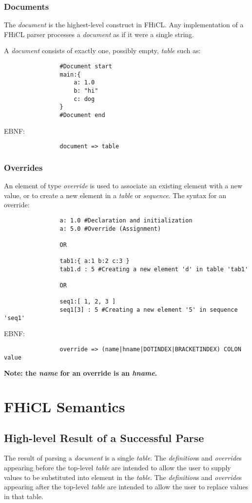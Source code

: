 \documentclass{article}
\begin{document}
		\subsubsection{Documents}
			The \emph{document} is the highest-level construct 
			in FHiCL.
			Any implementation of a FHiCL parser
			processes a \emph{document}
			as if it were a single string.

			A \emph{document} consists of exactly one,
			possibly empty,
			\emph{table} such as:
			\begin{verbatim}
				#Document start
				main:{
					a: 1.0
					b: "hi"
					c: dog
				}
				#Document end
			\end{verbatim}	
			\vspace{1mm}
			EBNF:
			\begin{verbatim}
				document => table
			\end{verbatim}
			
		\subsubsection{Overrides}
			An element of type \emph{override} is used to associate 
			an existing element with a new value,
			or to create a new element in a \emph{table} or \emph{sequence}.
			The syntax for an override:
			\begin{verbatim}
				a: 1.0 #Declaration and initialization
				a: 5.0 #Override (Assignment)
				
				OR
				
				tab1:{ a:1 b:2 c:3 }
				tab1.d : 5 #Creating a new element 'd' in table 'tab1'
				
				OR
				
				seq1:[ 1, 2, 3 ]
				seq1[3] : 5 #Creating a new element '5' in sequence 'seq1'
			\end{verbatim}
			\vspace{1mm}
			EBNF:
			\begin{verbatim}
				override => (name|hname|DOTINDEX|BRACKETINDEX) COLON value
			\end{verbatim}	
			\bf Note: \rm the \emph{name} for an override 
			is an \emph{hname}.
			
\section{FHiCL Semantics}
	\subsection{High-level Result of a Successful Parse}
		The result of parsing a \emph{document}
		is a single \emph{table}.
		The \emph{definition}s and \emph{override}s
		appearing before the top-level \emph{table}
		are intended to allow the user
		to supply values to be substituted into element in the \emph{table}.
		The \emph{definition}s and \emph{override}s
		appearing after the top-level \emph{table}
		are intended to allow the user
		to replace values in that table.
\end{document}
